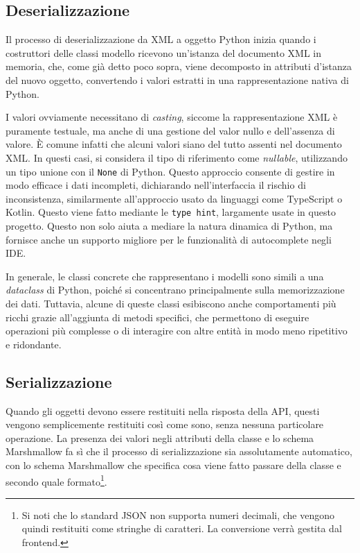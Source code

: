 \subsection{Deserializzazione}
Il processo di deserializzazione da XML a oggetto Python inizia quando i costruttori delle classi modello ricevono un'istanza del documento XML in memoria, che, come già detto poco sopra, viene decomposto in attributi d'istanza del nuovo oggetto, convertendo i valori estratti in una rappresentazione nativa di Python.

I valori ovviamente necessitano di \emph{casting}, siccome la rappresentazione XML è puramente testuale, ma anche di una gestione del valor nullo e dell'assenza di valore. È comune infatti che alcuni valori siano del tutto assenti nel documento XML. In questi casi, si considera il tipo di riferimento come \emph{nullable}, utilizzando un tipo unione con il \texttt{None} di Python. Questo approccio consente di gestire in modo efficace i dati incompleti, dichiarando nell'interfaccia il rischio di inconsistenza, similarmente all'approccio usato da linguaggi come TypeScript o Kotlin. Questo viene fatto mediante le \texttt{type hint}, largamente usate in questo progetto. Questo non solo aiuta a mediare la natura dinamica di Python, ma fornisce anche un supporto migliore per le funzionalità di autocomplete negli IDE.

In generale, le classi concrete che rappresentano i modelli sono simili a una \emph{dataclass} di Python, poiché si concentrano principalmente sulla memorizzazione dei dati. Tuttavia, alcune di queste classi esibiscono anche comportamenti più ricchi grazie all'aggiunta di metodi specifici, che permettono di eseguire operazioni più complesse o di interagire con altre entità in modo meno ripetitivo e ridondante.

\subsection{Serializzazione}
Quando gli oggetti devono essere restituiti nella risposta della API, questi vengono semplicemente restituiti così come sono, senza nessuna particolare operazione. La presenza dei valori negli attributi della classe e lo schema Marshmallow fa sì che il processo di serializzazione sia assolutamente automatico, con lo schema Marshmallow che specifica cosa viene fatto passare della classe e secondo quale formato\footnote{Si noti che lo standard JSON non supporta numeri decimali, che vengono quindi restituiti come stringhe di caratteri. La conversione verrà gestita dal frontend.}.

